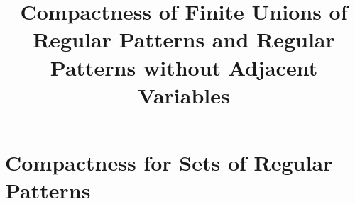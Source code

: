 \documentclass[paper]{ieice}
\title{Compactness of Finite Unions of Regular Patterns and Regular Patterns without Adjacent Variables}
\begin{document}
\maketitle











\section{Compactness for Sets of Regular Patterns}














\end{document}
